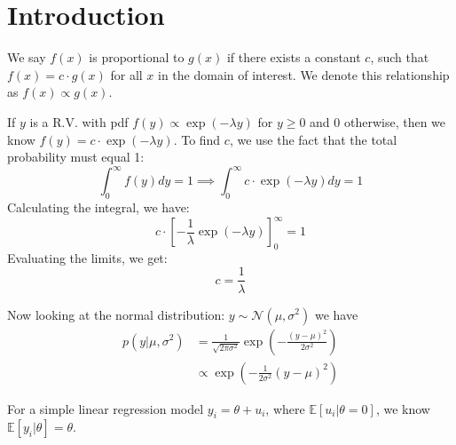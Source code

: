 \section{Introduction}

\begin{definition}
    We say $f(x)$ is proportional to $g(x)$ if there exists a constant $c$,
    such that $f(x) = c \cdot g(x)$ for all $x$ in the domain of interest.
    We denote this relationship as $f(x) \propto g(x)$.
\end{definition}

If $y$ is a R.V. with pdf $f(y) \propto \exp(-\lambda y)$ for $y \geq 0$ and $0$ otherwise,
then we know $f(y) = c \cdot \exp(-\lambda y)$.
To find $c$, we use the fact that the total probability must equal 1:
\begin{equation}
    \int_0^\infty f(y) dy = 1 \implies \int_0^\infty c \cdot \exp(-\lambda y) dy = 1
\end{equation}
Calculating the integral, we have:
\begin{equation}
    c \cdot \left[ -\frac{1}{\lambda} \exp(-\lambda y) \right]_0^\infty = 1
\end{equation}
Evaluating the limits, we get:
\begin{equation}
    c = \frac{1}{\lambda}
\end{equation}

Now looking at the normal distribution: $y \sim \mathcal{N} \left( \mu , \sigma^2 \right)$
we have
\begin{align}
    p(y | \mu, \sigma^2) &= \frac{1}{\sqrt{2 \pi \sigma^2}} \exp \left( -\frac{(y - \mu)^2}{2\sigma^2} \right) \\
    & \propto \exp \left( -\frac{1}{2\sigma^2} (y - \mu)^2 \right)
\end{align}

For a simple linear regression model $y_i = \theta + u_i$, where $\mathbb{E}[ u_i | \theta =0]$,
we know $\mathbb{E}[ y_i | \theta ] = \theta$.



